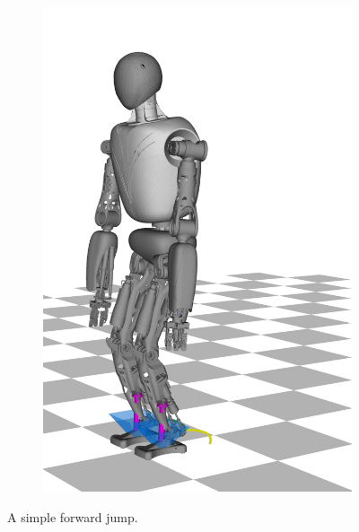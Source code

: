 \begin{figure}[h!]
\begin{subfigure}{.16\textwidth}
	\includegraphics[width=1\linewidth]{fig/jumpForward/snaps/6x}
	\caption{}
\end{subfigure}%
\caption{A simple forward jump.}
\label{fig:jumpForward_Snaps}
\end{figure} 

